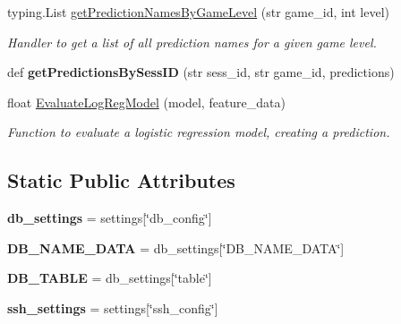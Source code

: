 \begin{DoxyCompactItemize}
typing.\+List \mbox{\hyperlink{class_r_t_server_1_1_r_t_server_a53ed74b50b616e1db6094a9ae62243f5}{get\+Prediction\+Names\+By\+Game\+Level}} (str game\+\_\+id, int level)
\begin{DoxyCompactList}\small\item\em Handler to get a list of all prediction names for a given game level. \end{DoxyCompactList}\item 
\mbox{\label{class_r_t_server_1_1_r_t_server_a4baab4e1403e5201c3e73f590b1e50e9}} 
def {\bfseries get\+Predictions\+By\+Sess\+ID} (str sess\+\_\+id, str game\+\_\+id, predictions)
\item 
float \mbox{\hyperlink{class_r_t_server_1_1_r_t_server_a4a3465a37859b43a764b131725087740}{Evaluate\+Log\+Reg\+Model}} (model, feature\+\_\+data)
\begin{DoxyCompactList}\small\item\em Function to evaluate a logistic regression model, creating a prediction. \end{DoxyCompactList}\end{DoxyCompactItemize}
\subsection*{Static Public Attributes}
\begin{DoxyCompactItemize}
\item 
\mbox{\label{class_r_t_server_1_1_r_t_server_afee7379654c01974287933197f16ab6a}} 
{\bfseries db\+\_\+settings} = settings\mbox{[}\char`\"{}db\+\_\+config\char`\"{}\mbox{]}
\item 
\mbox{\label{class_r_t_server_1_1_r_t_server_a996f612769b2cc41a2ecf2beda6a5984}} 
{\bfseries D\+B\+\_\+\+N\+A\+M\+E\+\_\+\+D\+A\+TA} = db\+\_\+settings\mbox{[}\char`\"{}D\+B\+\_\+\+N\+A\+M\+E\+\_\+\+D\+A\+TA\char`\"{}\mbox{]}
\item 
\mbox{\label{class_r_t_server_1_1_r_t_server_ac48b02f533dbb33c511bf3133127b4d5}} 
{\bfseries D\+B\+\_\+\+T\+A\+B\+LE} = db\+\_\+settings\mbox{[}\char`\"{}table\char`\"{}\mbox{]}
\item 
\mbox{\label{class_r_t_server_1_1_r_t_server_a4a347320e716f5984ac4595303e0c695}} 
{\bfseries ssh\+\_\+settings} = settings\mbox{[}\char`\"{}ssh\+\_\+config\char`\"{}\mbox{]}
\end{DoxyCompactItemize}

